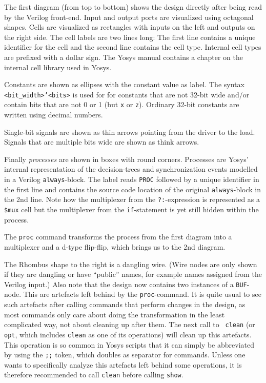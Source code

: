 \documentclass[9pt,technote,a4paper]{IEEEtran}
\begin{document}
The first diagram (from top to bottom) shows the design directly after being
read by the Verilog front-end. Input and output ports are visualized using
octagonal shapes. Cells are visualized as rectangles with inputs on the left
and outputs on the right side. The cell labels are two lines long: The first line
contains a unique identifier for the cell and the second line contains the cell
type. Internal cell types are prefixed with a dollar sign. The Yosys manual
contains a chapter on the internal cell library used in Yosys.

Constants are shown as ellipses with the constant value as label. The syntax
{\tt <bit\_width>'<bits>} is used for for constants that are not 32-bit wide
and/or contain bits that are not 0 or 1 (but {\tt x} or {\tt z}). Ordinary
32-bit constants are written using decimal numbers.

Single-bit signals are shown as thin arrows pointing from the driver to the
load. Signals that are multiple bits wide are shown as think arrows.

Finally {\it processes\/} are shown in boxes with round corners. Processes
are Yosys' internal representation of the decision-trees and synchronization
events modelled in a Verilog {\tt always}-block. The label reads {\tt PROC}
followed by a unique identifier in the first line and contains the source code
location of the original {\tt always}-block in the 2nd line. Note how the
multiplexer from the {\tt ?:}-expression is represented as a {\tt \$mux} cell
but the multiplexer from the {\tt if}-statement is yet still hidden within the
process.

\medskip

The {\tt proc} command transforms the process from the first diagram into a
multiplexer and a d-type flip-flip, which brings us to the 2nd diagram.

The Rhombus shape to the right is a dangling wire. (Wire nodes are only shown
if they are dangling or have "`public"' names, for example names assigned from
the Verilog input.) Also note that the design now contains two instances of a
{\tt BUF}-node. This are artefacts left behind by the {\tt proc}-command. It is
quite usual to see such artefacts after calling commands that perform changes
in the design, as most commands only care about doing the transformation in the
least complicated way, not about cleaning up after them. The next call to {\tt
clean} (or {\tt opt}, which includes {\tt clean} as one of its operations) will
clean up this artefacts.  This operation is so common in Yosys scripts that it
can simply be abbreviated by using the {\tt ;;} token, which doubles as
separator for commands. Unless one wants to specifically analyze this artefacts
left behind some operations, it is therefore recommended to call {\tt clean}
before calling {\tt show}.
\end{document}
